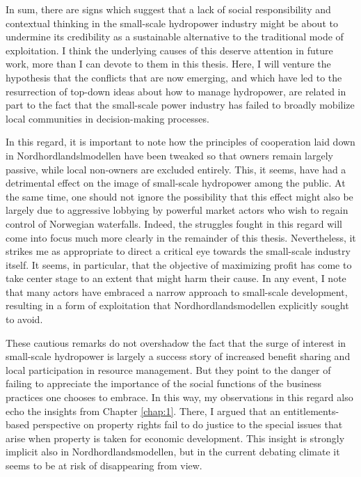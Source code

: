 In sum, there are signs which suggest that a lack of social responsibility and contextual thinking in the small-scale hydropower industry might be about to undermine its credibility as a sustainable alternative to the traditional mode of exploitation. I think the underlying causes of this deserve attention in future work, more than I can devote to them in this thesis. Here, I will venture the hypothesis that the conflicts that are now emerging, and which have led to the resurrection of top-down ideas about how to manage hydropower, are related in part to the fact that the small-scale power industry has failed to broadly mobilize local communities in decision-making processes. 

In this regard, it is important to note how the principles of cooperation laid down in Nordhordlandslmodellen have been tweaked so that owners remain largely passive, while local non-owners are excluded entirely. This, it seems, have had a detrimental effect on the image of small-scale hydropower among the public. At the same time, one should not ignore the possibility that this effect might also be largely due to  aggressive lobbying by powerful market actors who wish to regain control of Norwegian waterfalls. Indeed, the struggles fought in this regard will come into focus much more clearly in the remainder of this thesis. Nevertheless, it strikes me as appropriate to direct a critical eye towards the small-scale industry itself. It seems, in particular, that the objective of maximizing profit has come to take center stage to an extent that might harm their cause. In any event, I note that many actors have embraced a narrow approach to small-scale development, resulting in a form of exploitation that Nordhordlandsmodellen explicitly sought to avoid.

These cautious remarks do not overshadow the fact that the surge of interest in small-scale hydropower is largely a success story of increased benefit sharing and local participation in resource management. But they point to the danger of failing to appreciate the importance of the social functions of the business practices one chooses to embrace. In this way, my observations in this regard also echo the insights from Chapter \ref{chap:1}. There, I argued that an entitlements-based perspective on property rights fail to do justice to the special issues that arise when property is taken for economic development. This insight is strongly implicit also in Nordhordlandsmodellen, but in the current debating climate it seems to be at risk of disappearing from view. 

